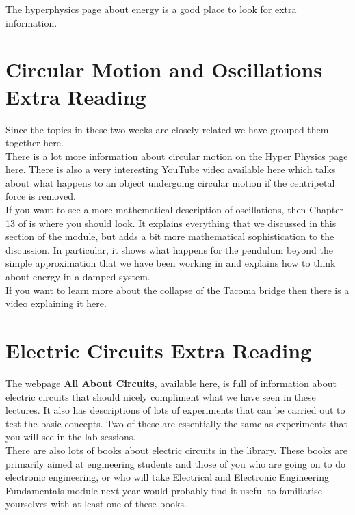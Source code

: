 \documentclass[a4paper,12pt]{book}
\begin{document}
The hyperphysics page about  \href{https://hyperphysics.phy-astr.gsu.edu/hbase/enecon.html}{energy} is a good place to look for extra information.

\section{Circular Motion and Oscillations Extra Reading}
Since the topics in these two weeks are closely related we have grouped them together here. \\

There is a lot more information about circular motion on the Hyper Physics page \href{https://hyperphysics.phy-astr.gsu.edu/hbase/circ.html#circ}{here}. There is also a very interesting YouTube video available \href{https://www.youtube.com/watch?v=AL2Chc6p\_Kk\&ab\_channel=AllThingsPhysics}{here} which talks about what happens to an object undergoing circular motion if the centripetal force is removed. \\

If you want to see a more mathematical description of oscillations, then Chapter 13 of \citep{YandF2019} is where you should look. It explains everything that we discussed in this section of the module, but adds a bit more mathematical sophistication to the discussion. In particular, it shows what happens for the pendulum beyond the simple approximation that we have been working in and explains how to think about energy in a damped system. \\

If you want to learn more about the collapse of the Tacoma bridge then there is a video explaining it \href{https://www.youtube.com/watch?v=3mclp9QmCGs}{here}.

\section{Electric Circuits Extra Reading} 
The webpage \textbf{All About Circuits}, available \href{https://www.allaboutcircuits.com/textbook/}{here}, is full of information about electric circuits that should nicely compliment what we have seen in these lectures. It also has descriptions of lots of experiments that can be carried out to test the basic concepts. Two of these are essentially the same as experiments that you will see in the lab sessions. \\

There are also lots of books about electric circuits in the library. These books are primarily aimed at engineering students and those of you who are going on to do electronic engineering, or who will take Electrical and Electronic Engineering Fundamentals module next year would probably find it useful to familiarise yourselves with at least one of these books.
\end{document}
